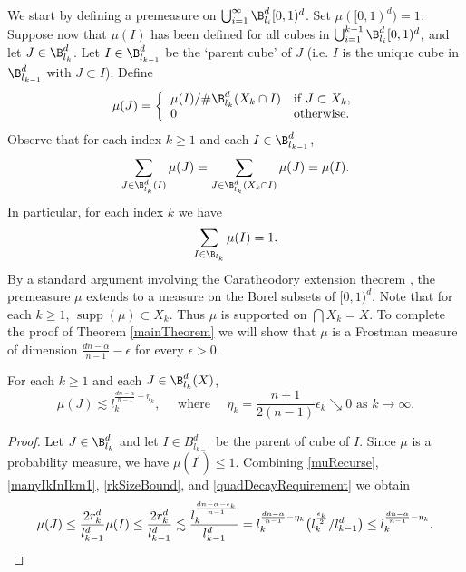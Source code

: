 We start by defining a premeasure on $\bigcup_{i = 1}^\infty \B^d_{l_i}[0,1)^d$. Set $\mu([0,1)^d) = 1$. Suppose now that $\mu(I)$ has been defined for all cubes in $\bigcup_{i = 1}^{k-1} \B^d_{l_i}[0,1)^d$, and let $J \in \B^d_{l_k}$. Let $I \in \B^d_{l_{k-1}}$ be the `parent cube' of $J$ (i.e. $I$ is the unique cube in $\B^d_{l_{k-1}}$ with $J \subset I$). Define
\begin{equation} \label{muRecurse} 
\mu(J) = \left\{ \begin{array}{ll}
{\mu(I)}/{\# \B^d_{l_k}(X_k \cap I)}& \textrm{if }  J \subset X_k,\\
0& \textrm{otherwise}.
\end{array}
\right. 
\end{equation}
Observe that for each index $k\geq 1$ and each $I \in \B_{l_{k-1}}^d$, 
\begin{equation}\label{muBreakDown}
\sum_{J\in \B_{l_k}^d(I) }\mu(J)=\sum_{J \in \B_{l_k}^d(X_k\cap I) }\mu(J) = \mu(I).
\end{equation}
In particular, for each index $k$ we have
$$
\sum_{I\in\B_{l_k}}\mu(I)=1.
$$
By a standard argument involving the Caratheodory extension theorem \cite[Proposition 1.7]{Falconer}, the premeasure $\mu$ extends to a measure on the Borel subsets of $[0,1)^d$. Note that for each $k\geq 1$, $\operatorname{supp}(\mu)\subset X_k$. Thus $\mu$ is supported on $\bigcap X_k = X$. To complete the proof of Theorem \ref{mainTheorem} we will show that $\mu$ is a Frostman measure of dimension $\frac{dn - \alpha}{n - 1}-\epsilon$ for every $\epsilon>0$. 



\begin{lemma}\label{massSomeScales}
	For each $k\geq 1$ and each $J \in \B^d_{l_k}(X)$, 
	$$
	\mu(J) \lesssim l_k^{\frac{dn-\alpha}{n-1}- \eta_k}, \quad \text{ where } \quad \eta_k = \frac{n+1}{2(n-1)} \epsilon_k \searrow 0 \text{ as } k \rightarrow \infty.
	$$
\end{lemma}
\begin{proof}
	Let $J \in \B^d_{l_k}$ and let $I \in B^d_{l_{k-1}}$ be the parent of cube of $I$. Since $\mu$ is a probability measure, we have $\mu(I^\prime)\leq 1$. Combining \eqref{muRecurse}, \eqref{manyIkInIkm1}, \eqref{rkSizeBound}, and \eqref{quadDecayRequirement} we obtain
	$$
	\mu(J)\leq \frac{2r_k^d}{l_{k-1}^d}\mu(I)\leq \frac{2r_k^d}{l_{k-1}^d}\lesssim \frac{l_{k}^{\frac{dn-\alpha - \epsilon_k}{n-1}}}{l_{k-1}^d}=l_k^{\frac{dn-\alpha}{n-1}-\eta_k}\big(l_k^{\frac{\epsilon_k}{2}}/l_{k-1}^d\big)\leq l_k^{\frac{dn-\alpha}{n-1}-\eta_k}.\qedhere
	$$
\end{proof}


